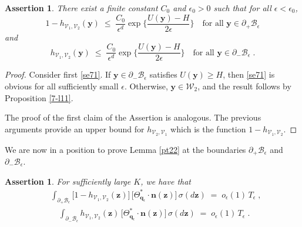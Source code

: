 \documentclass[reqno]{amsart}
\newcounter{as}[section]
\newtheorem{asser}[as]{Assertion}
\newcommand{\mc}[1]{{\mathcal #1}}
\newcommand{\bs}[1]{{\boldsymbol #1}}
\newcommand{\<}{\langle}
\renewcommand{\>}{\rangle}
\begin{document}
\begin{asser}
\label{bl10}
There exist a finite constant $C_0$ and $\epsilon_0>0$ such that for
all $\epsilon<\epsilon_0$,
\begin{equation*}
1-h_{\mc{V}_{1},\mc{V}_{2}}(\bs{y})\;\le\; \frac{C_0}{\epsilon^d}
\exp\Big\{ \frac{U(\bs{y})-H}{2\epsilon}\Big\} \quad
\text{for all $\bs{y}\in\partial_{+}\mc{B}_{\epsilon}$}
\end{equation*}
and
\begin{equation}
\label{se71}
h_{\mc{V}_{1},\mc{V}_{2}}(\bs{y})\;\le\;\frac{C_0}{\epsilon^{d}}
\exp\Big\{ \frac{U(\bs{y})-H}{2\epsilon}\Big\} \quad
\text{for all $\bs{y}\in\partial_{-}\mc{B}_{\epsilon}$}\;.
\end{equation}
\end{asser}

\begin{proof}
Consider first \eqref{se71}. If $\bs{y} \in\partial_{-}
\mc{B}_{\epsilon}$ satisfies $U(\bs{y})\ge H$, then \eqref{se71} is
obvious for all sufficiently small $\epsilon$. Otherwise, $\bs{y}
\in \mc W_2$, and the result follows by Proposition \ref{7-l11}.

The proof of the first claim of the Assertion is analogous. The previous
arguments provide an upper bound for $h_{\mc{V}_{2},\mc{V}_{1}}$
which is the function $1-h_{\mc{V}_{1},\mc{V}_{2}}$.
\end{proof}

We are now in a position to prove Lemma \ref{pt22} at the boundaries
$\partial_{+}\mc{B}_{\epsilon}$ and $\partial_{-}\mc{B}_{\epsilon}$.

\begin{asser}
\label{bs2}
For sufficiently large $K$, we have that
\begin{align*}
& \int_{\partial_{+}\mc{B}_{\epsilon}}
\big[1-h_{\mc{V}_{1},\mc{V}_{2}}(\bs{z})\big]\,
\big[\Theta_{\bs{q}_{\epsilon}}^{*}\cdot\bs{n}(\bs{z})\big]\,
\sigma(d\bs{z})
\;=\;o_{\epsilon}(1)\, T_{\epsilon}\;,
\\
&  \quad \int_{\partial_{-}\mc{B}_{\epsilon}}
h_{\mc{V}_{1},\mc{V}_{2}}(\bs{z}) \,
\big[\Theta_{\bs{q}_{\epsilon}}^{*}
\cdot\bs{n}(\bs{z})\big]\, \sigma(d\bs{z})
\;=\;o_{\epsilon}(1)\, T_{\epsilon}\;.
\end{align*}
\end{asser}
\end{document}
